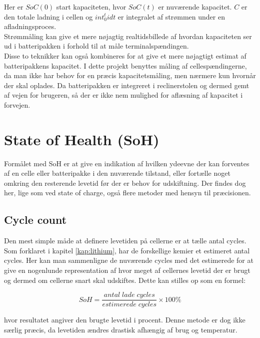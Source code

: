 Her er $SoC(0)$ start kapaciteten, hvor $SoC(t)$ er nuværende kapacitet. $C$ er den totale ladning i cellen og $int_{0}^{t} idt$ er integralet af strømmen under en afladningsproces.
\\

Strømmåling kan give et mere nøjagtig realtidsbillede af hvordan kapaciteten ser ud i batteripakken i forhold til at måle terminalspændingen.
\\

Disse to teknikker kan også kombineres for at give et mere nøjagtigt estimat af batteripakkens kapacitet. I dette projekt benyttes måling af cellespændingerne, da man ikke har behov for en præcis kapacitetsmåling, men nærmere kun hvornår der skal oplades. Da batteripakken er integreret i reclinerstolen og dermed gemt af vejen for brugeren, så der er ikke nem mulighed for aflæsning af kapacitet i forvejen. 

\section{State of Health (SoH)}
Formålet med SoH er at give en indikation af hvilken ydeevne der kan forventes af en celle eller batteripakke i den nuværende tilstand, eller fortælle noget omkring den resterende levetid før der er behov for udskiftning. Der findes dog her, lige som ved state of charge, også flere metoder med hensyn til præcisionen. 

\subsection{Cycle count}
Den mest simple måde at definere levetiden på cellerne er at tælle antal cycles. Som forklaret i kapitel \ref{kap:lithium}, har de forskellige kemier et estimeret antal cycles. Her kan man sammenligne de nuværende cycles med det estimerede for at give en nogenlunde representation af hvor meget af cellernes levetid der er brugt og dermed om cellerne snart skal udskiftes. Dette kan stilles op som en formel: 

\begin {equation} 
SoH = \frac{antal \; lade \; cycles}{estimerede \; cycles}\times 100\percent \label{eq:soh_cycles}
\end {equation}

hvor resultatet angiver den brugte levetid i procent. Denne metode er dog ikke særlig præcis, da levetiden ændres drastisk afhængig af brug og temperatur. 

